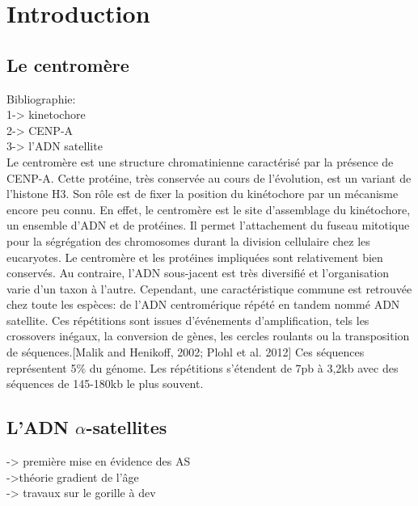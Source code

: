 \documentclass[12pt,a4paper]{article}
\begin{document}

\newpage
\tableofcontents
\setcounter{page}{0}
\thispagestyle{empty}
\newpage 

\section{Introduction}
\subsection{Le centromère}
Bibliographie:\\
1-> kinetochore\\
2-> CENP-A\\
3-> l'ADN satellite\\

Le centromère est une structure chromatinienne caractérisé par la présence de CENP-A. Cette protéine, très conservée au cours de l'évolution, est un variant de l'histone H3. Son rôle est de fixer la position du kinétochore par un mécanisme encore peu connu. En effet, le centromère est le site d'assemblage du kinétochore, un ensemble d'ADN et de protéines. Il permet l'attachement du fuseau mitotique pour la ségrégation des chromosomes durant la division cellulaire chez les eucaryotes. Le centromère et les protéines impliquées sont relativement bien conservés. Au contraire, l'ADN sous-jacent est très diversifié et l'organisation varie d'un taxon à l'autre. Cependant, une caractéristique commune est retrouvée chez toute les espèces: de l'ADN centromérique répété en tandem nommé ADN satellite. Ces répétitions sont issues d'événements d'amplification, tels les crossovers inégaux, la conversion de gènes, les cercles roulants ou la transposition de séquences.[Malik and Henikoff, 2002; Plohl et al. 2012]
Ces séquences représentent 5\% du génome. Les répétitions s'étendent de 7pb à 3,2kb avec des séquences de 145-180kb le plus souvent.  

\subsection{L'ADN $\alpha$-satellites}
-> première mise en évidence des AS\\
->théorie gradient de l'âge\\
-> travaux sur le gorille à dev\\
\end{document}

